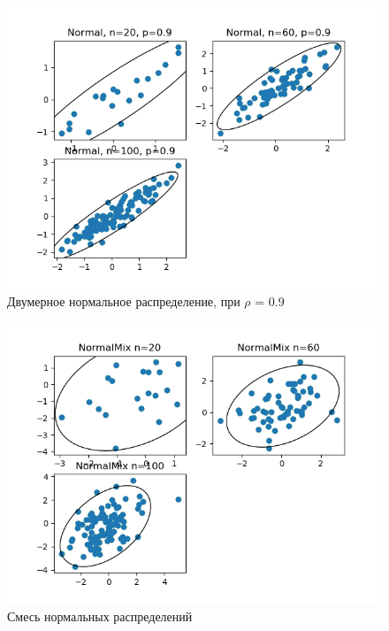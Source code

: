 \documentclass[a4]{article}
\begin{document}
\begin{center}
\begin{figure}[h!]
			\end{figure}
			\newpage
			\begin{figure}[h!]
				\includegraphics[width=\textwidth]{Normal9.png} 
				\caption[Двумерное нормальное распределение, при $\rho$ = 0.9]{Двумерное нормальное распределение, при $\rho$ = 0.9}
			\end{figure}
			\newpage
			\begin{figure}[h!]
				\includegraphics[width=\textwidth]{NormalMix9.png} 
				\caption[Смесь нормальных распределений]{Смесь нормальных распределений}
			\end{figure}
			
		\end{center}
		
\end{document}
